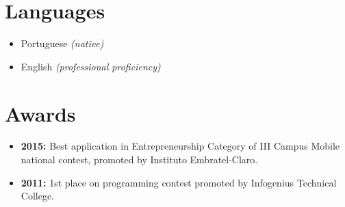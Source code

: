 \documentclass[11pt,a4paper,sans]{moderncv}        %
\begin{document}
\section{Languages}

\vspace{6pt}

\begin{itemize}

\item{Portuguese \textit{(native)}}
\item{English \textit{(professional proficiency)}}

\end{itemize}

\section{Awards}

\vspace{6pt}
 
\begin{itemize}

\item{\textbf{2015:} Best application in Entrepreneurship Category of III Campus Mobile national contest, promoted by Instituto Embratel-Claro.}

\item{\textbf{2011:} 1st place on programming contest promoted by Infogenius Technical College.}

\end{itemize}

\newpage
\nocite{*}



\end{document}
